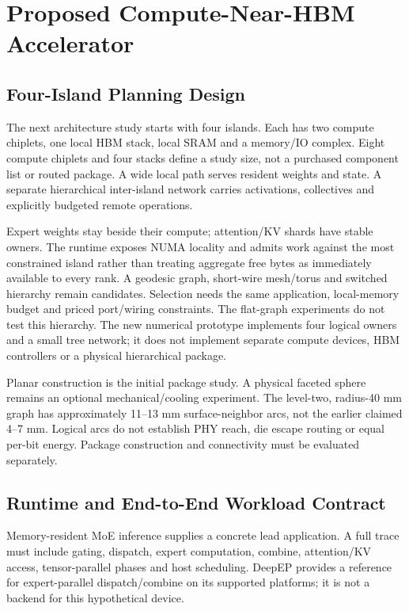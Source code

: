 \documentclass[11pt,a4paper]{article}
\begin{document}
\section{Proposed Compute-Near-HBM Accelerator}\label{sec:proposal}

\subsection{Four-Island Planning Design}

The next architecture study starts with four islands. Each has two compute
chiplets, one local HBM stack, local SRAM and a memory/IO complex. Eight
compute chiplets and four stacks define a study size, not a purchased
component list or routed package. A wide local path serves resident weights
and state. A separate hierarchical inter-island network carries activations,
collectives and explicitly budgeted remote operations.

Expert weights stay beside their compute; attention/KV shards have stable
owners. The runtime exposes NUMA locality and admits work against the most
constrained island rather than treating aggregate free bytes as immediately
available to every rank. A geodesic graph, short-wire mesh/torus and switched
hierarchy remain candidates. Selection needs the same application,
local-memory budget and priced port/wiring constraints. The flat-graph
experiments do not test this hierarchy. The new numerical prototype implements
four logical owners and a small tree network; it does not implement separate
compute devices, HBM controllers or a physical hierarchical package.

Planar construction is the initial package study. A physical faceted sphere
remains an optional mechanical/cooling experiment. The level-two,
radius-40 mm graph has approximately 11--13 mm surface-neighbor arcs, not the
earlier claimed 4--7 mm. Logical arcs do not establish PHY reach, die escape
routing or equal per-bit energy. Package construction and connectivity must
be evaluated separately.

\subsection{Runtime and End-to-End Workload Contract}

Memory-resident MoE inference supplies a concrete lead application. A full
trace must include gating, dispatch, expert computation, combine,
attention/KV access, tensor-parallel phases and host scheduling. DeepEP
provides a reference for expert-parallel dispatch/combine on its supported
platforms\cite{deepep}; it is not a backend for this hypothetical device.
\end{document}
